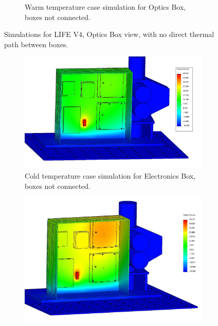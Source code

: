 \begin{figure}
\begin{subfigure}[h]{0.6\textwidth}
        \caption{Warm temperature case simulation for Optics Box, boxes not connected.}
        \label{fig:LIFE_V4_TA_Optics_2c}
    \end{subfigure}
    \caption{Simulations for LIFE V4, Optics Box view, with no direct thermal path between boxes.}
    \label{LIFE_V4_TA_2_Optics}
\end{figure}

\begin{figure}
    \centering
    \begin{subfigure}[h]{0.53\textwidth}
        \centering
        \includegraphics[width=\textwidth]{chap3_images/LIFE_V4_images/TA_Full_Model_Iter_10_ebox.JPG}
        \caption{Cold temperature case simulation for Electronics Box, boxes not connected.}
        \label{fig:LIFE_V4_TA_Ebox_2a}
    \end{subfigure}
    \begin{subfigure}[h]{0.53\textwidth}
        \centering
        \includegraphics[width=\textwidth]{chap3_images/LIFE_V4_images/TA_Full_Model_Iter_11_ebox.JPG}

\end{subfigure}
\end{figure}
